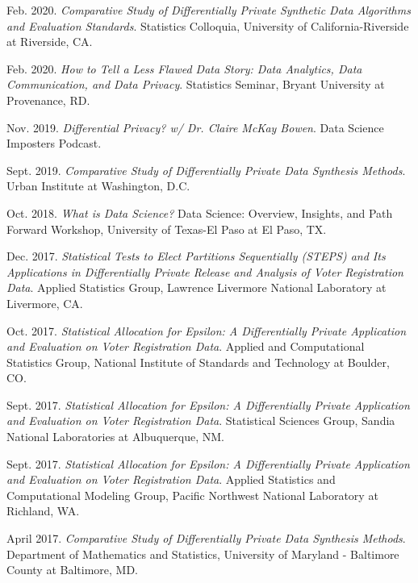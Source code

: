\documentclass[11pt, letterpaper, roman]{moderncv} %
\begin{document}
\begin{etaremune}[topsep=0pt, itemsep=6pt, partopsep=0pt, parsep=0pt]
  \item Feb. 2020. \textit{Comparative Study of Differentially Private Synthetic Data Algorithms and Evaluation Standards}. Statistics Colloquia, University of California-Riverside at Riverside, CA.
  
  \item Feb. 2020. \textit{How to Tell a Less Flawed Data Story: Data Analytics, Data Communication, and Data Privacy}. Statistics Seminar, Bryant University at Provenance, RD.
  
  \item Nov. 2019. \textit{Differential Privacy? w/ Dr. Claire McKay Bowen}. Data Science Imposters Podcast.
  
  \item Sept. 2019. \textit{Comparative Study of Differentially Private Data Synthesis Methods}. Urban Institute at Washington, D.C.
  
  \item Oct. 2018. \textit{What is Data Science?} Data Science: Overview, Insights, and Path Forward Workshop, University of Texas-El Paso at El Paso, TX.

  \item Dec. 2017. \textit{Statistical Tests to Elect Partitions Sequentially (STEPS) and Its Applications in Differentially Private Release and Analysis of Voter Registration Data}. Applied Statistics Group, Lawrence Livermore National Laboratory at Livermore, CA.
  
  \item Oct. 2017. \textit{Statistical Allocation for Epsilon: A Differentially Private Application and Evaluation on Voter Registration Data}. Applied and Computational Statistics Group, National Institute of Standards and Technology at Boulder, CO.
  
  \item Sept. 2017. \textit{Statistical Allocation for Epsilon: A Differentially Private Application and Evaluation on Voter Registration Data}. Statistical Sciences Group, Sandia National Laboratories at Albuquerque, NM.
  
  \item Sept. 2017. \textit{Statistical Allocation for Epsilon: A Differentially Private Application and Evaluation on Voter Registration Data}. Applied Statistics and Computational Modeling Group, Pacific Northwest National Laboratory at Richland, WA.
  
  \item April 2017. \textit{Comparative Study of Differentially Private Data Synthesis Methods}. Department of Mathematics and Statistics, University of Maryland - Baltimore County at Baltimore, MD.
\end{etaremune}
\end{document}
